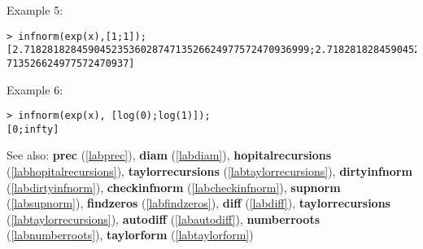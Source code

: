 \noindent Example 5: 
\begin{center}\begin{minipage}{15cm}\begin{Verbatim}[frame=single,commandchars=\\\|\~]
> infnorm(exp(x),[1;1]);
[2.7182818284590452353602874713526624977572470936999;2.7182818284590452353602874
713526624977572470937]
\end{Verbatim}
\end{minipage}\end{center}
\noindent Example 6: 
\begin{center}\begin{minipage}{15cm}\begin{Verbatim}[frame=single,commandchars=\\\|\~]
> infnorm(exp(x), [log(0);log(1)]);
[0;infty]
\end{Verbatim}
\end{minipage}\end{center}
See also: \textbf{prec} (\ref{labprec}), \textbf{diam} (\ref{labdiam}), \textbf{hopitalrecursions} (\ref{labhopitalrecursions}), \textbf{taylorrecursions} (\ref{labtaylorrecursions}), \textbf{dirtyinfnorm} (\ref{labdirtyinfnorm}), \textbf{checkinfnorm} (\ref{labcheckinfnorm}), \textbf{supnorm} (\ref{labsupnorm}), \textbf{findzeros} (\ref{labfindzeros}), \textbf{diff} (\ref{labdiff}), \textbf{taylorrecursions} (\ref{labtaylorrecursions}), \textbf{autodiff} (\ref{labautodiff}), \textbf{numberroots} (\ref{labnumberroots}), \textbf{taylorform} (\ref{labtaylorform})
